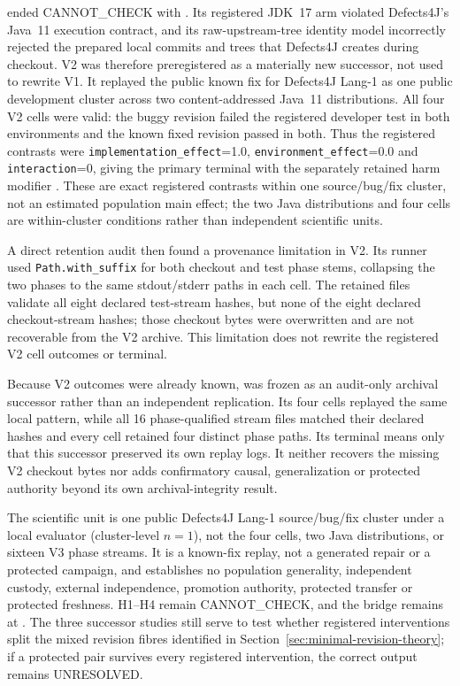  ended \textsf{CANNOT\_CHECK} with
. Its registered JDK~17 arm violated
Defects4J's Java~11 execution contract, and its raw-upstream-tree identity model
incorrectly rejected the prepared local commits and trees that Defects4J creates
during checkout. V2 was therefore preregistered as a materially new successor,
not used to rewrite V1. It replayed the public known fix for Defects4J Lang-1 as
one public development cluster across two content-addressed Java~11
distributions. All four V2 cells were valid: the buggy revision failed the
registered developer test in both environments and the known fixed revision
passed in both. Thus the registered contrasts were
\texttt{implementation\_effect}=1.0,
\texttt{environment\_effect}=0.0 and \texttt{interaction}=0, giving the primary
terminal  with the separately retained harm
modifier .
These are exact registered contrasts within one source/bug/fix cluster, not an
estimated population main effect; the two Java distributions and four cells are
within-cluster conditions rather than independent scientific units.

A direct retention audit then found a provenance limitation in V2. Its runner
used \texttt{Path.with\_suffix} for both checkout and test phase stems, collapsing
the two phases to the same stdout/stderr paths in each cell. The retained files
validate all eight declared test-stream hashes, but none of the eight declared
checkout-stream hashes; those checkout bytes were overwritten and are not
recoverable from the V2 archive. This limitation does not rewrite the registered
V2 cell outcomes or terminal.

Because V2 outcomes were already known,  was frozen
as an audit-only archival successor rather than an independent replication. Its
four cells replayed the same local pattern, while all 16 phase-qualified stream
files matched their declared hashes and every cell retained four distinct phase
paths. Its  terminal means only that this
successor preserved its own replay logs. It neither recovers the missing V2
checkout bytes nor adds confirmatory causal, generalization or protected
authority beyond its own archival-integrity result.

The scientific unit is one public Defects4J Lang-1 source/bug/fix cluster under
a local evaluator (cluster-level $n=1$), not the four cells, two Java
distributions, or sixteen V3 phase streams. It is a known-fix replay, not a generated
repair or a protected campaign, and establishes no population generality,
independent custody, external independence, promotion authority, protected
transfer or protected freshness. H1--H4 remain \textsf{CANNOT\_CHECK}, and the
bridge remains at
.
The three successor studies still serve to test whether registered interventions
split the mixed revision fibres identified in
Section~\ref{sec:minimal-revision-theory}; if a protected pair survives every
registered intervention, the correct output remains \textsf{UNRESOLVED}.

